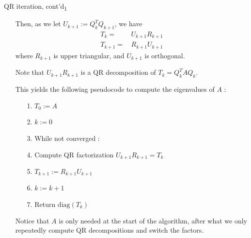 \documentclass[t,usepdftitle=false]{beamer}
\begin{document}
\begin{frame}{QR iteration, cont'd\textsubscript{1}}
\begin{itemize}
\item[]Then, as we let $U_{k+1}:=Q_k^TQ_{k+1}$, we have
\begin{align*}
T_k=&\,U_{k+1}R_{k+1}\\
T_{k+1}=&\,R_{k+1}U_{k+1}
\end{align*}
where $R_{k+1}$ is upper triangular, and $U_{k+1}$ is orthogonal.
\item[]Note that $U_{k+1}R_{k+1}$ is a QR decomposition of $T_k=Q_k^TAQ_k$.
\item[]This yields the following pseudocode to compute the eigenvalues of $A$ :\vspace{.1cm}
\begin{itemize}\normalsize
\item[1.] $T_0:=A$\vspace{.07cm}
\item[2.] $k:=0$\vspace{.07cm}
\item[3.] While not converged :\vspace{.07cm}
\item[4.]\hspace{.4cm}Compute QR factorization $U_{k+1}R_{k+1}=T_k$\vspace{.07cm}
\item[5.]\hspace{.4cm}$T_{k+1}:=R_{k+1}U_{k+1}$\vspace{.07cm}
\item[6.]\hspace{.4cm}$k:=k+1$\vspace{.07cm}
\item[7.] Return $\mathrm{diag}(T_k)$\vspace{.2cm}
\end{itemize}
Notice that $A$ is only needed at the start of the algorithm, after what we only repeatedly compute QR decompositions and switch the factors.
\end{itemize}
\end{frame}
\end{document}
